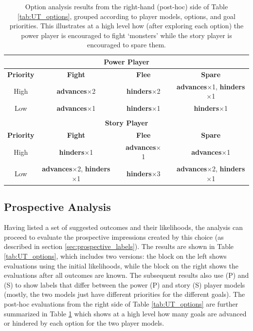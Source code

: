 \documentclass[arts,article,submit,moreauthors,pdftex,10pt,a4paper]{Definitions/mdpi}
\newcommand{\advances}{\textbf{\color{advances}advances}}
\newcommand{\hinders}{\textbf{\color{hinders}hinders}}
\begin{document}
\begin{table}[H]
\centering
\begin{tabular}{c c c c c c}
  \toprule
\multicolumn{6}{c}{\textbf{Power Player}} \\
  \midrule
  \textbf{Priority} & \textbf{Fight} && \textbf{Flee} && \textbf{Spare} \\
  \cmidrule(r){1-1} \cmidrule{2-2} \cmidrule{4-4} \cmidrule{6-6}
  \centering High & \advances{}$\times$2 && \hinders{}$\times$2 && \advances{}$\times$1, \hinders{}$\times$1  \\
  \cmidrule(r){1-1} \cmidrule{2-2} \cmidrule{4-4} \cmidrule{6-6}
  \centering Low & \advances{}$\times$1 && \hinders{}$\times$1 && \hinders{}$\times$1 \\
  \bottomrule
  \multicolumn{6}{c}{\vspace{1em}} \\
  \toprule
\multicolumn{6}{c}{\textbf{Story Player}} \\
  \midrule
  \textbf{Priority} & \textbf{Fight} && \textbf{Flee} && \textbf{Spare} \\
  \cmidrule(r){1-1} \cmidrule{2-2} \cmidrule{4-4} \cmidrule{6-6}
  \centering High & \hinders{}$\times$1 && \advances{}$\times$1 && \advances{}$\times$1  \\
  \cmidrule(r){1-1} \cmidrule{2-2} \cmidrule{4-4} \cmidrule{6-6}
  \centering Low & \advances{}$\times$2, \hinders{}$\times$1 && \hinders{}$\times$3 && \advances{}$\times$2, \hinders{}$\times$1 \\
  \bottomrule
\end{tabular}
  \caption[\emph{Undertale}option summary]{Option analysis results from the right-hand (post-hoc) side of Table \ref{tab:UT_options}, grouped according to player models, options, and goal priorities. This illustrates at a high level how (after exploring each option) the power player is encouraged to fight `monsters' while the story player is encouraged to spare them.}
\label{tab:UT_option_summary}
\end{table}

\subsection{Prospective Analysis}

Having listed a set of suggested outcomes and their likelihoods, the analysis can proceed to evaluate the prospective impressions created by this choice (as described in section \ref{sec:prospective_labels}).
%
The results are shown in Table \ref{tab:UT_options}, which includes two versions: the block on the left shows evaluations using the initial likelihoods, while the block on the right shows the evaluations after all outcomes are known.
%
The subsequent results also use (P) and (S) to show labels that differ between the power (P) and story (S) player models (mostly, the two models just have different priorities for the different goals).
%
The post-hoc evaluations from the right side of Table \ref{tab:UT_options} are further summarized in Table \ref{tab:UT_option_summary} which shows at a high level how many goals are advanced or hindered by each option for the two player models.
\end{document}
